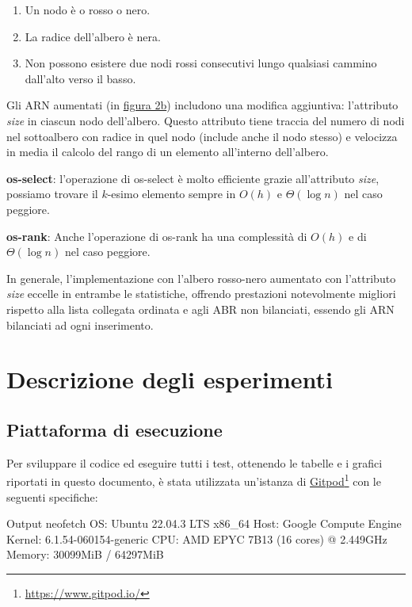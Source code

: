 \documentclass[onecolumn]{article}
\newcommand\anchor[2]{%
  \href{#2}{#1}\footnote{\url{#2}}%
}
\begin{document}
\begin{enumerate}
\setlength\itemsep{-0.25em}
    \item Un nodo è o rosso o nero.
    \item La radice dell'albero è nera.
    \item Non possono esistere due nodi rossi consecutivi lungo qualsiasi cammino dall'alto verso il basso.
\end{enumerate}

Gli ARN aumentati (in \hyperref[fig:alberi]{figura 2b}) includono una modifica aggiuntiva: l'attributo \textit{size} in ciascun nodo dell'albero. Questo attributo tiene traccia del numero di nodi nel sottoalbero con radice in quel nodo (include anche il nodo stesso) e velocizza in media il calcolo del rango di un elemento all'interno dell'albero. \vspace{1em}

\textbf{os-select}: l'operazione di os-select è molto efficiente grazie all'attributo \textit{size}, possiamo trovare il $k$-esimo elemento sempre in $O(h)$ e $\Theta(\log n)$ nel caso peggiore. \vspace{0.5em}

\textbf{os-rank}: Anche l'operazione di os-rank ha una complessità di $O(h)$ e di $\Theta(\log n)$ nel caso peggiore. \vspace{1em}

In generale, l'implementazione con l'albero rosso-nero aumentato con l'attributo \textit{size} eccelle in entrambe le statistiche, offrendo prestazioni notevolmente migliori rispetto alla lista collegata ordinata e agli ABR non bilanciati, essendo gli ARN bilanciati ad ogni inserimento.

\section{Descrizione degli esperimenti}
\subsection{Piattaforma di esecuzione}

Per sviluppare il codice ed eseguire tutti i test, ottenendo le tabelle e i grafici riportati in questo documento, è stata utilizzata un'istanza di \anchor{Gitpod}{https://www.gitpod.io/} con le seguenti specifiche:
\begin{bashCode}{Output neofetch}
OS: Ubuntu 22.04.3 LTS x86_64 
Host: Google Compute Engine 
Kernel: 6.1.54-060154-generic 
CPU: AMD EPYC 7B13 (16 cores) @ 2.449GHz 
Memory: 30099MiB / 64297MiB
\end{bashCode}
\end{document}
